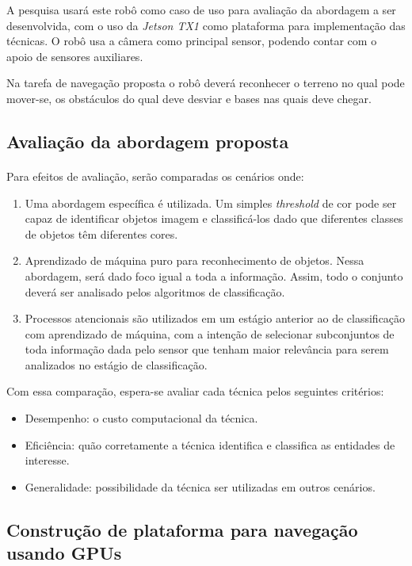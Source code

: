 \documentclass[11pt]{article}
\newcommand{\tit}[1]{\textit{#1}}
\begin{document}
A pesquisa usará este robô como caso de uso para
avaliação da abordagem a ser desenvolvida, com o uso da \tit{Jetson TX1} 
como plataforma para implementação das técnicas.
O robô usa a câmera como principal sensor, podendo contar com o apoio de sensores auxiliares.

Na tarefa de navegação proposta o robô deverá reconhecer o terreno no qual pode mover-se, os obstáculos do
qual deve desviar e bases nas quais deve chegar.

\subsection{Avaliação da abordagem proposta}
\paragraph{}
Para efeitos de avaliação, serão comparadas os cenários onde: 
\begin{enumerate}
	\item Uma abordagem específica é utilizada.  
		Um simples \tit{threshold} de cor pode ser capaz de identificar objetos
		imagem e classificá-los dado que diferentes classes de objetos têm
		diferentes cores.
	\item Aprendizado de máquina puro para reconhecimento de objetos.
		Nessa abordagem, será dado foco igual a toda a informação. 
		Assim, todo o conjunto deverá ser analisado pelos algoritmos de 
		classificação.
	\item Processos atencionais são utilizados em um estágio anterior ao de 
		classificação com aprendizado de máquina, com a intenção de selecionar
		subconjuntos de toda informação dada pelo sensor que tenham maior 
		relevância para serem analizados no estágio de classificação.
\end{enumerate}

Com essa comparação, espera-se avaliar cada técnica pelos seguintes critérios:
\begin{itemize}
	\item Desempenho: o custo computacional da técnica.
	\item Eficiência: quão corretamente a técnica identifica e classifica
		as entidades de interesse.
	\item Generalidade: possibilidade da técnica ser utilizadas em outros 
		cenários.
\end{itemize}

\subsection{Construção de plataforma para navegação usando GPUs}
\end{document}
